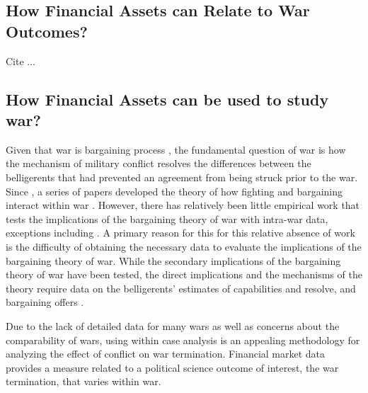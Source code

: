 \subsection{How Financial Assets can Relate to War Outcomes?}
\label{sec:how-financial-assets}

Cite ...


\subsection{How Financial Assets can be used to study war?}
\label{sec:how-financial-assets-1}

Given that war is bargaining process \parencite{Fearon1995}, the fundamental question of war is how the mechanism of military conflict resolves the differences between the belligerents that had prevented an agreement from being struck prior to the war.
Since \textcite{Fearon1995}, a series of papers developed the theory of how fighting and bargaining interact within war \parencites{FilsonWerner2002}{Slantchev2003}{SmithStam2004}{Powell2004}{LeventogluSlantchev2007}{LangloisLanglois2009}{WolfordReiterCarrubba2011}.
However, there has relatively been little empirical work that tests the implications of the bargaining theory of war with intra-war data, exceptions including \textcites{Goemans2000}{Ramsay2008}{Reiter2009}{Weisiger2013}{Weisiger2015}.
A primary reason for this for this relative absence of work is the difficulty of obtaining the necessary data to evaluate the implications of the bargaining theory of war.
While the secondary implications of the bargaining theory of war have been tested, the direct implications and the mechanisms of the theory require data on the belligerents' estimates of capabilities and resolve, and bargaining offers \parencite[32]{Reiter2003}.


Due to the lack of detailed data for many wars as well as concerns about the comparability of wars, using within case analysis is an appealing methodology for analyzing the effect of conflict on war termination.
Financial market data provides a measure related to a political science outcome of interest, the war termination, that varies within war.

